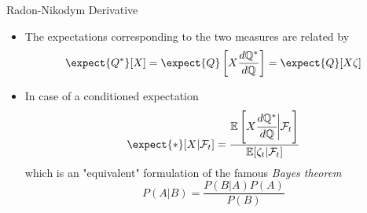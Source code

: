 \documentclass{beamer}
\begin{document}
\begin{frame}{Radon-Nikodym Derivative}
  \begin{itemize}
  \item The expectations corresponding to the two measures are related by
    \begin{equation*}
      \expect{Q^*}[X] = \expect{Q}\left[X\frac{d\mathbb{Q}^*}{d\mathbb{Q}}\right]= \expect{Q}[X\zeta]
    \end{equation*}
	\pause
  \item In case of a conditioned expectation
    \begin{equation}
      \expect{*}[X|\mathcal{F}_t] = \frac{\mathbb{E}\left[X\cfrac{d\mathbb{Q}^*}{d\mathbb{Q}}\bigg|\mathcal{F}_t\right]}{\mathbb{E}[\zeta_t|\mathcal{F}_t]}
      \label{eq:conditioned_expectation}
    \end{equation}
    which is an "equivalent" formulation of the famous \emph{Bayes theorem}
    \begin{equation*}
      P(A|B)=\frac{P(B|A)P(A)}{P(B)}
    \end{equation*}
  \end{itemize}

\end{frame}
\end{document}
